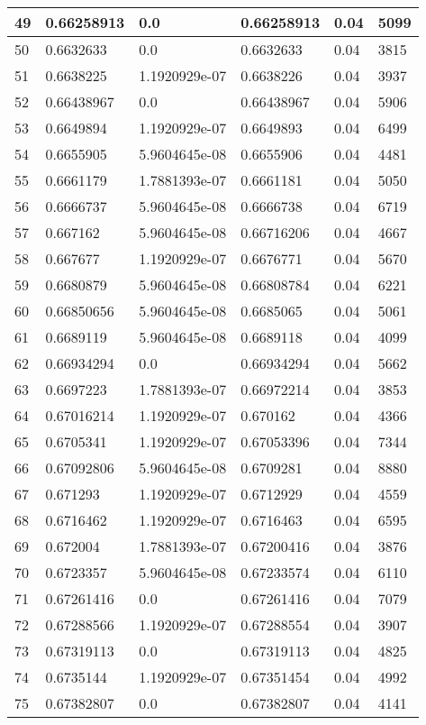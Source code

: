 \begin{longtable}{|l|l|l|l|l|l|}
49 & 0.66258913 & 0.0 & 0.66258913 & 0.04 & 5099 \\ \hline 
50 & 0.6632633 & 0.0 & 0.6632633 & 0.04 & 3815 \\ \hline 
51 & 0.6638225 & 1.1920929e-07 & 0.6638226 & 0.04 & 3937 \\ \hline 
52 & 0.66438967 & 0.0 & 0.66438967 & 0.04 & 5906 \\ \hline 
53 & 0.6649894 & 1.1920929e-07 & 0.6649893 & 0.04 & 6499 \\ \hline 
54 & 0.6655905 & 5.9604645e-08 & 0.6655906 & 0.04 & 4481 \\ \hline 
55 & 0.6661179 & 1.7881393e-07 & 0.6661181 & 0.04 & 5050 \\ \hline 
56 & 0.6666737 & 5.9604645e-08 & 0.6666738 & 0.04 & 6719 \\ \hline 
57 & 0.667162 & 5.9604645e-08 & 0.66716206 & 0.04 & 4667 \\ \hline 
58 & 0.667677 & 1.1920929e-07 & 0.6676771 & 0.04 & 5670 \\ \hline 
59 & 0.6680879 & 5.9604645e-08 & 0.66808784 & 0.04 & 6221 \\ \hline 
60 & 0.66850656 & 5.9604645e-08 & 0.6685065 & 0.04 & 5061 \\ \hline 
61 & 0.6689119 & 5.9604645e-08 & 0.6689118 & 0.04 & 4099 \\ \hline 
62 & 0.66934294 & 0.0 & 0.66934294 & 0.04 & 5662 \\ \hline 
63 & 0.6697223 & 1.7881393e-07 & 0.66972214 & 0.04 & 3853 \\ \hline 
64 & 0.67016214 & 1.1920929e-07 & 0.670162 & 0.04 & 4366 \\ \hline 
65 & 0.6705341 & 1.1920929e-07 & 0.67053396 & 0.04 & 7344 \\ \hline 
66 & 0.67092806 & 5.9604645e-08 & 0.6709281 & 0.04 & 8880 \\ \hline 
67 & 0.671293 & 1.1920929e-07 & 0.6712929 & 0.04 & 4559 \\ \hline 
68 & 0.6716462 & 1.1920929e-07 & 0.6716463 & 0.04 & 6595 \\ \hline 
69 & 0.672004 & 1.7881393e-07 & 0.67200416 & 0.04 & 3876 \\ \hline 
70 & 0.6723357 & 5.9604645e-08 & 0.67233574 & 0.04 & 6110 \\ \hline 
71 & 0.67261416 & 0.0 & 0.67261416 & 0.04 & 7079 \\ \hline 
72 & 0.67288566 & 1.1920929e-07 & 0.67288554 & 0.04 & 3907 \\ \hline 
73 & 0.67319113 & 0.0 & 0.67319113 & 0.04 & 4825 \\ \hline 
74 & 0.6735144 & 1.1920929e-07 & 0.67351454 & 0.04 & 4992 \\ \hline 
75 & 0.67382807 & 0.0 & 0.67382807 & 0.04 & 4141 \\ \hline 
\end{longtable}